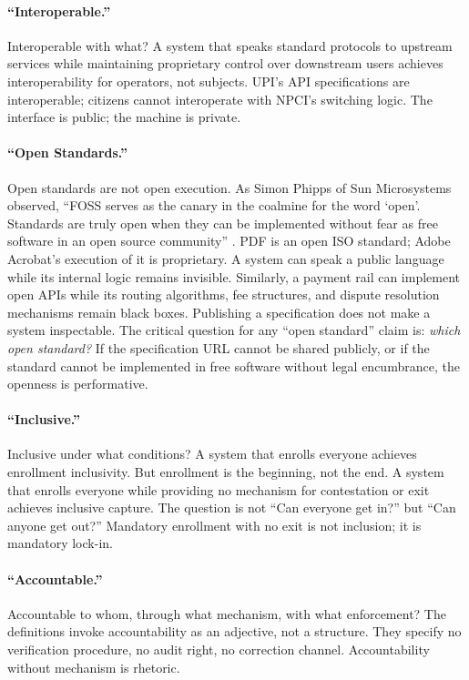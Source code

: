 \documentclass{article}
\begin{document}
\paragraph{``Interoperable.''}  Interoperable with what? A system that speaks standard protocols to upstream services while maintaining proprietary control over downstream users achieves interoperability for operators, not subjects. UPI's API specifications are interoperable; citizens cannot interoperate with NPCI's switching logic. The interface is public; the machine is private.

\paragraph{``Open Standards.''}  Open standards are not open execution. As Simon Phipps of Sun Microsystems observed, ``FOSS serves as the canary in the coalmine for the word `open'. Standards are truly open when they can be implemented without fear as free software in an open source community'' \citep{phipps2007}. PDF is an open ISO standard; Adobe Acrobat's execution of it is proprietary. A system can speak a public language while its internal logic remains invisible. Similarly, a payment rail can implement open APIs while its routing algorithms, fee structures, and dispute resolution mechanisms remain black boxes. Publishing a specification does not make a system inspectable. The critical question for any ``open standard'' claim is: \textit{which open standard?} If the specification URL cannot be shared publicly, or if the standard cannot be implemented in free software without legal encumbrance, the openness is performative.

\paragraph{``Inclusive.''}  Inclusive under what conditions? A system that enrolls everyone achieves enrollment inclusivity. But enrollment is the beginning, not the end. A system that enrolls everyone while providing no mechanism for contestation or exit achieves inclusive capture. The question is not ``Can everyone get in?'' but ``Can anyone get out?'' Mandatory enrollment with no exit is not inclusion; it is mandatory lock-in.

\paragraph{``Accountable.''}  Accountable to whom, through what mechanism, with what enforcement? The definitions invoke accountability as an adjective, not a structure. They specify no verification procedure, no audit right, no correction channel. Accountability without mechanism is rhetoric.
\end{document}
